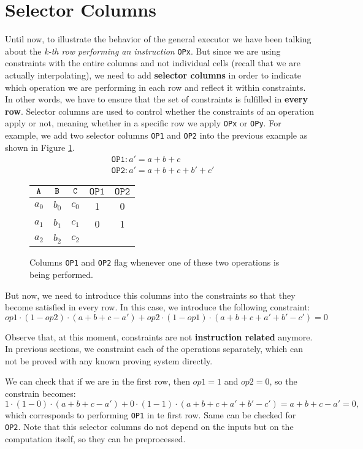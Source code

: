 



\section{Selector Columns}

Until now, to illustrate the behavior of the general executor we have been talking about the \textit{k-th row performing an instruction} \texttt{OPx}. But since we are using constraints with the entire columns and not individual cells (recall that we are actually interpolating), we need to add \textbf{selector columns} in order to indicate which operation we are performing in each row and reflect it within constraints. In other words, we have to ensure that the set of constraints is fulfilled in \textbf{every row}. Selector columns are used to control whether the constraints of an operation apply or not, meaning whether in a specific row we apply \texttt{OPx} or \texttt{OPy}. For example, we add two selector columns \texttt{OP1} and \texttt{OP2} into the previous example as shown in Figure \ref{fig:selector-columns}.
\begin{align*}
&\texttt{OP1}: a'=a+b+c \\
&\texttt{OP2}: a'=a+b+c+b'+c'
\end{align*}

\begin{figure}[H]
\centering
\begin{tabular}{|c|c|c|c|c|}\hline
\centering
$\mathtt{A}$ & $\mathtt{B}$ & $\mathtt{C}$ & $\mathtt{OP1}$ & $\mathtt{OP2}$ \\ \hline
$a_0$ & $b_0$ & $c_0$ & 1 & 0 \\ \hline
$a_1$ & $b_1$ & $c_1$ & 0 & 1\\ \hline
$a_2$ & $b_2$ & $c_2$ & & \\ \hline
\end{tabular}
\caption{Columns \texttt{OP1} and \texttt{OP2} flag whenever one of these two operations is being performed. }
\label{fig:selector-columns}
\end{figure}

But now, we need to introduce this columns into the constraints so that they become satisfied in every row. In this case, we introduce the following constraint:
\[
op1 \cdot (1-op2) \cdot (a+b+c-a') + op2 \cdot (1-op1) \cdot (a+b+c+a'+b'-c') = 0
\]

\begin{bremark}
Observe that, at this moment, constraints are not \textbf{instruction related} anymore. In previous sections, we constraint each of the operations separately, which can not be proved with any known proving system directly.
\end{bremark}

We can check that if we are in the first row, then $op1=1$ and $op2=0$, so the constrain becomes:
$$1 \cdot (1-0) \cdot (a+b+c-a') + 0 \cdot (1-1) \cdot (a+b+c+a'+b'-c') = \boxed{a+b+c-a'=0},$$
which corresponds to performing \texttt{OP1} in te first row. Same can be checked for \texttt{OP2}. Note that this selector columns do not depend on the inputs but on the computation itself, so they can be preprocessed.

